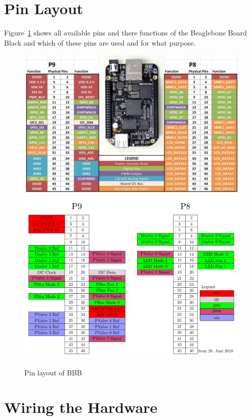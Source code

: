 \documentclass[
	fontsize=10pt
	paper=a4
]{scrartcl}
\begin{document}
\clearpage

\section{Pin Layout}

Figure~\ref{fig:BBBpins} shows all available pins and there functions of the Beaglebone Board Black and which of these pins are used and for what purpose.
\begin{figure}[h!]
\begin{center}
\includegraphics[width=.8\textwidth]{Images/beaglebone-black-pinout.jpg} \\
\includegraphics[width=.9\textwidth]{Images/PinLayout/PinLayout.pdf}
\caption{Pin layout of BBB}
\label{fig:BBBpins}
\end{center}
\end{figure}


\section{Wiring the Hardware}
\end{document}
